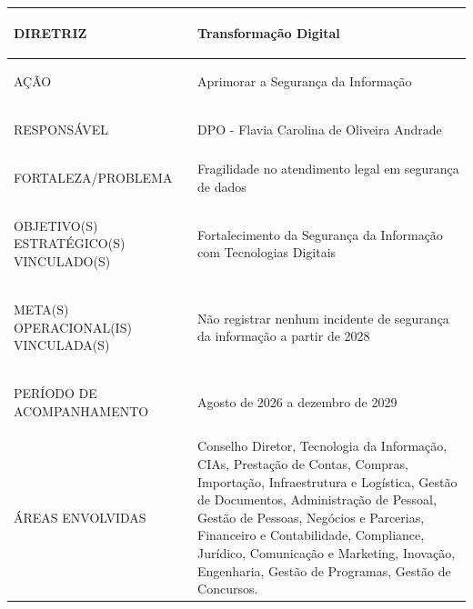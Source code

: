 \documentclass[12pt,a4paper]{article}
\newcommand{\PlanoVersao}{0.7}
\newlength{\utilTab}
\newlength{\colIdRot}\newlength{\colIdVal}
\begin{document}
\begingroup
\footnotesize\singlespacing
{}
\setlength{\arrayrulewidth}{1pt}
\setlength{\tabcolsep}{5.4pt}
\renewcommand{\arraystretch}{1.45}
\setlength{\utilTab}{\dimexpr\textwidth-4\tabcolsep-3\arrayrulewidth\relax}
\setlength{\colIdRot}{0.2819\utilTab}
\setlength{\colIdVal}{\dimexpr\utilTab-\colIdRot\relax}
\begin{tabular}{|>{\cellcolor{azulClaro}\bfseries\raggedright\arraybackslash}p{\colIdRot}|>{\raggedright\arraybackslash}p{\colIdVal}|}
\hline
DIRETRIZ & Transformação Digital \\
\hline
AÇÃO & Aprimorar a Segurança da Informação \\
\hline
RESPONSÁVEL & DPO - Flavia Carolina de Oliveira Andrade\\
\hline
FORTALEZA/PROBLEMA & Fragilidade no atendimento legal em segurança de dados \\
\hline
OBJETIVO(S) ESTRATÉGICO(S) VINCULADO(S) & Fortalecimento da Segurança da Informação com Tecnologias Digitais \\
\hline
META(S) OPERACIONAL(IS) VINCULADA(S) & Não registrar nenhum incidente de segurança da informação a partir de 2028 \\
\hline
PERÍODO DE ACOMPANHAMENTO & Agosto de 2026 a dezembro de 2029 \\
\hline
ÁREAS ENVOLVIDAS & Conselho Diretor, Tecnologia da Informação, CIAs, Prestação de Contas, Compras, Importação, Infraestrutura e Logística, Gestão de Documentos, Administração de Pessoal, Gestão de Pessoas, Negócios e Parcerias, Financeiro e Contabilidade, Compliance, Jurídico, Comunicação e Marketing, Inovação, Engenharia, Gestão de Programas, Gestão de Concursos. \\
\hline
\end{tabular}
\endgroup
\end{document}
